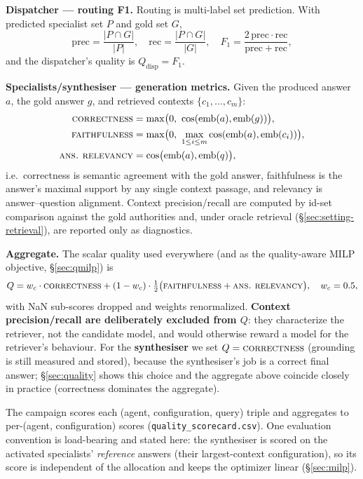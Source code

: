 \documentclass[11pt]{article}
\begin{document}
\textbf{Dispatcher --- routing F1.} Routing is multi-label set prediction. With
predicted specialist set $P$ and gold set $G$,
\begin{equation}
\mathrm{prec}=\frac{|P\cap G|}{|P|},\quad
\mathrm{rec}=\frac{|P\cap G|}{|G|},\quad
F_1=\frac{2\,\mathrm{prec}\cdot \mathrm{rec}}{\mathrm{prec}+\mathrm{rec}},
\label{eq:routingf1}
\end{equation}
and the dispatcher's quality is $Q_{\mathrm{disp}}=F_1$.

\textbf{Specialists/synthesiser --- generation metrics.} Given the produced answer
$a$, the gold answer $g$, and retrieved contexts $\{c_1,\dots,c_m\}$:
\begin{align}
\textsc{correctness} &= \max\!\big(0,\ \cos(\mathrm{emb}(a),\mathrm{emb}(g))\big),
\label{eq:corr}\\
\textsc{faithfulness} &= \max\!\big(0,\ \max_{1\le i\le m}\cos(\mathrm{emb}(a),\mathrm{emb}(c_i))\big),
\label{eq:faith}\\
\textsc{ans.\ relevancy} &= \cos\!\big(\mathrm{emb}(a),\mathrm{emb}(q)\big),
\label{eq:rel}
\end{align}
i.e.\ correctness is semantic agreement with the gold answer, faithfulness is the
answer's maximal support by any single context passage, and relevancy is
answer--question alignment. Context precision/recall are computed by id-set
comparison against the gold authorities and, under oracle retrieval
(§\ref{sec:setting-retrieval}), are reported only as diagnostics.

\textbf{Aggregate.} The scalar quality used everywhere (and as the quality-aware
MILP objective, §\ref{sec:qmilp}) is
\begin{equation}
Q=w_c\cdot \textsc{correctness}+(1-w_c)\cdot
\tfrac{1}{2}\big(\textsc{faithfulness}+\textsc{ans.\ relevancy}\big),
\quad w_c=0.5,
\label{eq:agg}
\end{equation}
with NaN sub-scores dropped and weights renormalized. \textbf{Context
precision/recall are deliberately excluded from $Q$}: they characterize the
retriever, not the candidate model, and would otherwise reward a model for the
retriever's behaviour. For the \textbf{synthesiser} we set $Q=\textsc{correctness}$
(grounding is still measured and stored), because the synthesiser's job is a
correct final answer; §\ref{sec:quality} shows this choice and the aggregate above
coincide closely in practice (correctness dominates the aggregate).

The campaign scores each (agent, configuration, query) triple and aggregates to
per-(agent, configuration) scores (\texttt{quality\_scorecard.csv}). One evaluation
convention is load-bearing and stated here: the synthesiser is scored on the
activated specialists' \emph{reference} answers (their largest-context
configuration), so its score is independent of the allocation and keeps the
optimizer linear (§\ref{sec:milp}).
\end{document}
